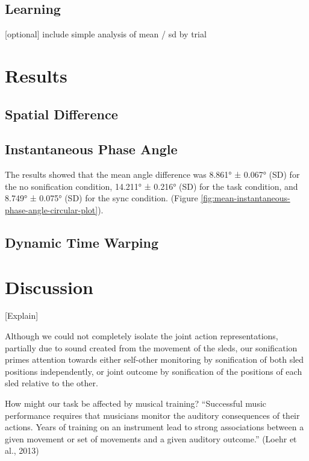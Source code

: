 \documentclass[10pt,a4paper,onecolumn]{article}
\begin{document}
\hypertarget{learning}{%
\subsection{Learning}\label{learning}}

{[}optional{]} include simple analysis of mean / sd by trial

\hypertarget{results}{%
\section{Results}\label{results}}

\hypertarget{spatial-difference}{%
\subsection{Spatial Difference}\label{spatial-difference}}

\hypertarget{instantaneous-phase-angle}{%
\subsection{Instantaneous Phase Angle}\label{instantaneous-phase-angle}}

The results showed that the mean angle difference
was 8.861° ± 0.067° (SD) for the no sonification condition,
14.211° ± 0.216° (SD) for the task condition, and
8.749° ± 0.075° (SD) for the sync condition. (Figure \ref{fig:mean-instantaneous-phase-angle-circular-plot}).

\hypertarget{dynamic-time-warping-1}{%
\subsection{Dynamic Time Warping}\label{dynamic-time-warping-1}}

\hypertarget{discussion}{%
\section{Discussion}\label{discussion}}

{[}Explain{]}

Although we could not completely isolate the joint action representations, partially due to sound created from the movement of the sleds, our sonification primes attention towards either self-other monitoring by sonification of both sled positions independently, or joint outcome by sonification of the positions of each sled relative to the other.

How might our task be affected by musical training? ``Successful music performance requires that musicians monitor the auditory consequences of their actions. Years of training on an instrument lead to strong associations between a given movement or set of movements and a given auditory outcome.'' (Loehr et al., 2013)
\end{document}
